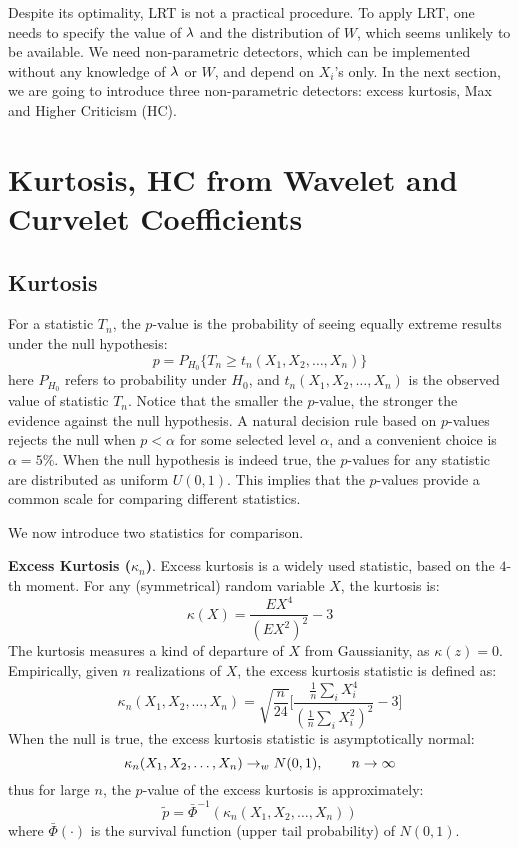 Despite its optimality, LRT is not a practical procedure. To apply LRT, one needs to specify the value of $\lambda$ and 
the distribution of $W$, which seems unlikely to be available. We need non-parametric detectors, which can be implemented 
without any knowledge of $\lambda$ or $W$, and depend on $X_i$'s only. In the next section, we are going to introduce three 
non-parametric detectors: excess kurtosis, Max and Higher Criticism (HC).   

\section{Kurtosis, HC from Wavelet and Curvelet Coefficients}
 
\subsection{Kurtosis}

For a statistic $T_n$, the $p$-value is the probability of seeing equally extreme results under the null hypothesis:
\[
p = P_{H_0} \{ T_n  \geq t_n(X_1,X_2, \ldots,X_n) \}
\] 
here $P_{H_0}$ refers to probability under $H_0$, and $t_n(X_1,X_2, \ldots,X_n)$ is the observed value of statistic $T_n$. 
Notice that the smaller the $p$-value, the stronger the evidence against the null hypothesis. A natural decision rule based 
on $p$-values rejects the null when $p < \alpha$ for some selected level $\alpha$, and a convenient choice is  $\alpha = 5\%$. 
When the null hypothesis is indeed true, the $p$-values for any statistic are distributed as uniform $U(0,1)$. This implies 
that the $p$-values provide a common scale for comparing different statistics. 

We now introduce two statistics for comparison. 

{\bf Excess Kurtosis ($\kappa_n$)}. Excess kurtosis is a widely used statistic, based on the $4$-th moment. 
For any (symmetrical) random variable $X$, the kurtosis is:
\[
\kappa(X) = \frac{EX^4}{(EX^2)^2} -3
\]
The kurtosis measures a kind of departure of $X$ from  Gaussianity, as $\kappa(z) =  0$.
Empirically, given $n$ realizations of $X$, the excess kurtosis statistic is defined as: 
\begin{equation}  \label{EqDefineK}
\kappa_n(X_1, X_2,\ldots,X_n)  = \sqrt{\frac{n}{24}} \biggl[ \frac{\frac{1}{n}\sum_i  X_i^4}{(\frac{1}{n}  \sum_i X_i^2)^2}  - 3  \biggr]
\end{equation} 
When the null is true, the excess kurtosis statistic is asymptotically normal:
\[
\kappa_n(X_1, X_2,\ldots,X_n)  \rightarrow_{w}  N(0,1), \qquad n \rightarrow \infty
\]
thus for large $n$, the $p$-value of the excess kurtosis is approximately:
\[
\tilde{p} = \bar{\Phi}^{-1} (\kappa_n(X_1, X_2,\ldots,X_n))
\]
where $\bar{\Phi}(\cdot)$ is the survival function (upper tail probability) of $N(0,1)$. 

